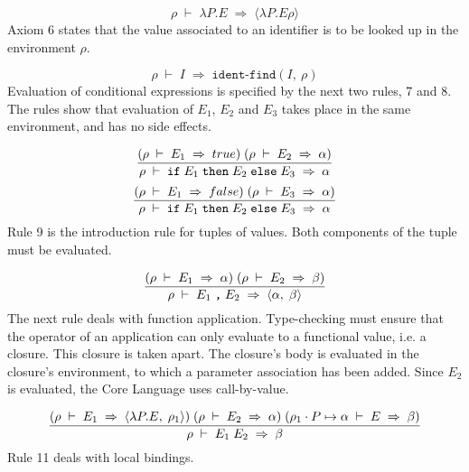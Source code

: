 \documentclass[10pt]{article}
\begin{document}
\begin{equation}
\rho{}\;\vdash{}\;\lambda{}P.E\;\Rightarrow{}\;\langle{}\lambda{}P.E\rho{}\rangle{}\end{equation}
Axiom 6 states that the value associated to an identifier is to be looked up in the environment $\rho{}$. 

\begin{equation}
\rho{}\;\vdash{}\;I\;\Rightarrow{}\;\texttt{ident-find}(I,\:\rho{})\end{equation}
Evaluation of conditional expressions is specified by the next two
rules, 7 and 8. The rules show that evaluation of $E_{1}$, $E_{2}$ and $E_{3}$ takes place in the same
environment, and has no side effects. 

\begin{equation}
\frac{{\mathrm\mathbf{}(}\rho{}\;\vdash{}\;E_{1}\;\Rightarrow{}\;true{\mathrm\mathbf{})}\;{\mathrm\mathbf{}(}\rho{}\;\vdash{}\;E_{2}\;\Rightarrow{}\;\alpha{}{\mathrm\mathbf{})}}%
{\rho{}\;\vdash{}\;\texttt{if}\;E_{1}\;\texttt{then}\;E_{2}\;\texttt{else}\;E_{3}\;\Rightarrow{}\;\alpha{}}\end{equation}
\begin{equation}
\frac{{\mathrm\mathbf{}(}\rho{}\;\vdash{}\;E_{1}\;\Rightarrow{}\;false{\mathrm\mathbf{})}\;{\mathrm\mathbf{}(}\rho{}\;\vdash{}\;E_{3}\;\Rightarrow{}\;\alpha{}{\mathrm\mathbf{})}}%
{\rho{}\;\vdash{}\;\texttt{if}\;E_{1}\;\texttt{then}\;E_{2}\;\texttt{else}\;E_{3}\;\Rightarrow{}\;\alpha{}}\end{equation}
Rule 9 is the introduction rule for tuples of values. Both components of the tuple must be evaluated. 

\begin{equation}
\frac{{\mathrm\mathbf{}(}\rho{}\;\vdash{}\;E_{1}\;\Rightarrow{}\;\alpha{}{\mathrm\mathbf{})}\;{\mathrm\mathbf{}(}\rho{}\;\vdash{}\;E_{2}\;\Rightarrow{}\;\beta{}{\mathrm\mathbf{})}}%
{\rho{}\;\vdash{}\;E_{1}\;\texttt{,}\;E_{2}\;\Rightarrow{}\;\langle{}\alpha{},\;\beta{}\rangle{}}\end{equation}
The next rule deals with function application. Type-checking must
ensure that the operator of an application can only evaluate to a
functional value, i.e. a closure. This closure is taken apart. The
closure's body is evaluated in the closure's environment, to which a
parameter association has been added. Since $E_{2}$ is
evaluated, the Core Language uses call-by-value. 

\begin{equation}
\frac{{\mathrm\mathbf{}(}\rho{}\;\vdash{}\;E_{1}\;\Rightarrow{}\;\langle{}\lambda{}P.E,\;\rho{}_{1}\rangle{}{\mathrm\mathbf{})}\;{\mathrm\mathbf{}(}\rho{}\;\vdash{}\;E_{2}\;\Rightarrow{}\;\alpha{}{\mathrm\mathbf{})}\;{\mathrm\mathbf{}(}\rho{}_{1}\cdot{}P\mapsto{}\alpha{}\;\vdash{}\;E\;\Rightarrow{}\;\beta{}{\mathrm\mathbf{})}}%
{\rho{}\;\vdash{}\;E_{1}\;E_{2}\;\Rightarrow{}\;\beta{}}\end{equation}
Rule 11 deals with local bindings. 
\end{document}
